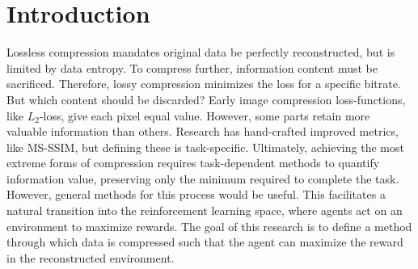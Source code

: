 \section{Introduction}
Lossless compression mandates original data be perfectly reconstructed, but is limited by data entropy. To compress further, information content must be sacrificed. Therefore, lossy compression minimizes the loss for a specific bitrate. But which content should be discarded? Early image compression loss-functions, like $L_2$-loss, give each pixel equal value. However, some parts retain more valuable information than others. Research has hand-crafted improved metrics, like MS-SSIM, but defining these is task-specific. Ultimately, achieving the most extreme forms of compression requires task-dependent methods to quantify information value, preserving only the minimum required to complete the task. However, general methods for this process would be useful. This facilitates a natural transition into the reinforcement learning space, where agents act on an environment to maximize rewards. The goal of this research is to define a method through which data is compressed such that the agent can maximize the reward in the reconstructed environment.
